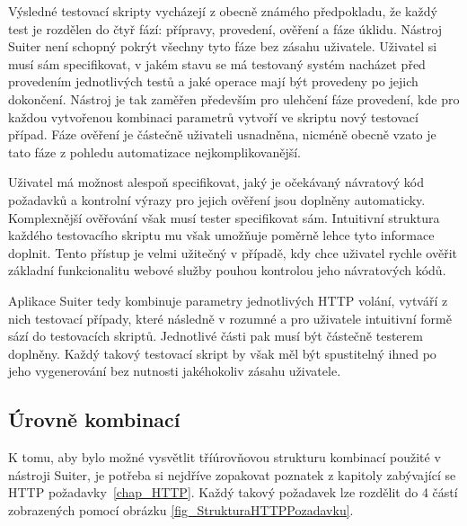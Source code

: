 Výsledné testovací skripty vycházejí z obecně známého předpokladu, že každý test je rozdělen do čtyř fází: přípravy, provedení, ověření a fáze úklidu. Nástroj Suiter není schopný pokrýt všechny tyto fáze bez zásahu uživatele. Uživatel si musí sám specifikovat, v jakém stavu se má testovaný systém nacházet před provedením jednotlivých testů a jaké operace mají být provedeny po jejich dokončení. Nástroj je tak zaměřen především pro ulehčení fáze provedení, kde pro každou vytvořenou kombinaci parametrů vytvoří ve skriptu nový testovací případ. Fáze ověření je částečně uživateli usnadněna, nicméně obecně vzato je tato fáze z pohledu automatizace nejkomplikovanější. 

Uživatel má možnost alespoň specifikovat, jaký je očekávaný návratový kód požadavků a kontrolní výrazy pro jejich ověření jsou doplněny automaticky. Komplexnější ověřování však musí tester specifikovat sám. Intuitivní struktura každého testovacího skriptu mu však umožňuje poměrně lehce tyto informace doplnit. Tento přístup je velmi užitečný v případě, kdy chce uživatel rychle ověřit základní funkcionalitu webové služby pouhou kontrolou jeho návratových kódů.


Aplikace Suiter tedy kombinuje parametry jednotlivých HTTP volání, vytváří z nich testovací případy, které následně v rozumné a pro uživatele intuitivní formě sází do testovacích skriptů. Jednotlivé části pak musí být částečně testerem doplněny. Každý takový testovací skript by však měl být spustitelný ihned po jeho vygenerování bez nutnosti jakéhokoliv zásahu uživatele.





\subsection*{Úrovně kombinací}
\label{subsec_UrovneKombinacii}

K tomu, aby bylo možné vysvětlit tříúrovňovou strukturu kombinací použité v nástroji Suiter, je potřeba si nejdříve zopakovat poznatek z kapitoly zabývající se HTTP požadavky~\ref{chap_HTTP}. Každý takový požadavek lze rozdělit do 4 částí zobrazených pomocí obrázku \ref{fig_StrukturaHTTPPozadavku}. 

